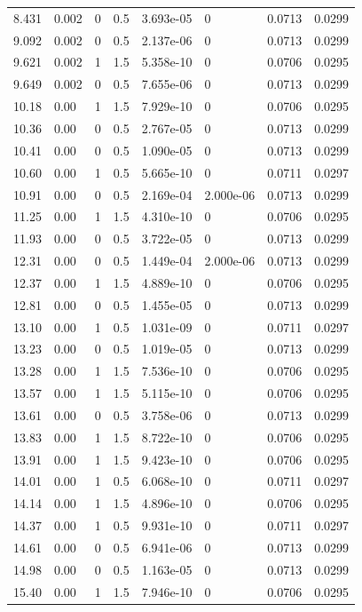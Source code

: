 \documentclass[preview]{standalone}
\begin{document}
{{\begin{tabular}{L{1.2cm}C{1.2cm} C{0.3cm}C{0.5cm} C{1.4cm}C{1.4cm} C{1.4cm}C{1.4cm}}
  8.431  &  0.002  & 0     & 0.5 &  3.693e-05  & 0  & 0.0713 &  0.0299   \\ 
  9.092  &  0.002  & 0     & 0.5 &  2.137e-06  & 0  & 0.0713 &  0.0299   \\ 
  9.621  &  0.002  & 1     & 1.5 &  5.358e-10  & 0  & 0.0706 &  0.0295   \\ 
  9.649  &  0.002  & 0     & 0.5 &  7.655e-06  & 0  & 0.0713 &  0.0299   \\ 
  10.18  &  0.00  & 1     & 1.5 &  7.929e-10  & 0  & 0.0706 &  0.0295   \\ 
  10.36  &  0.00  & 0     & 0.5 &  2.767e-05  & 0  & 0.0713 &  0.0299   \\ 
  10.41  &  0.00  & 0     & 0.5 &  1.090e-05  & 0  & 0.0713 &  0.0299   \\ 
  10.60  &  0.00  & 1     & 0.5 &  5.665e-10  & 0  & 0.0711 &  0.0297   \\ 
  10.91  &  0.00  & 0     & 0.5 &  2.169e-04  & 2.000e-06  & 0.0713 &  0.0299   \\ 
  11.25  &  0.00  & 1     & 1.5 &  4.310e-10  & 0  & 0.0706 &  0.0295   \\ 
  11.93  &  0.00  & 0     & 0.5 &  3.722e-05  & 0  & 0.0713 &  0.0299   \\ 
  12.31  &  0.00  & 0     & 0.5 &  1.449e-04  & 2.000e-06  & 0.0713 &  0.0299   \\ 
  12.37  &  0.00  & 1     & 1.5 &  4.889e-10  & 0  & 0.0706 &  0.0295   \\ 
  12.81  &  0.00  & 0     & 0.5 &  1.455e-05  & 0  & 0.0713 &  0.0299   \\ 
  13.10  &  0.00  & 1     & 0.5 &  1.031e-09  & 0  & 0.0711 &  0.0297   \\ 
  13.23  &  0.00  & 0     & 0.5 &  1.019e-05  & 0  & 0.0713 &  0.0299   \\ 
  13.28  &  0.00  & 1     & 1.5 &  7.536e-10  & 0  & 0.0706 &  0.0295   \\ 
  13.57  &  0.00  & 1     & 1.5 &  5.115e-10  & 0  & 0.0706 &  0.0295   \\ 
  13.61  &  0.00  & 0     & 0.5 &  3.758e-06  & 0  & 0.0713 &  0.0299   \\ 
  13.83  &  0.00  & 1     & 1.5 &  8.722e-10  & 0  & 0.0706 &  0.0295   \\ 
  13.91  &  0.00  & 1     & 1.5 &  9.423e-10  & 0  & 0.0706 &  0.0295   \\ 
  14.01  &  0.00  & 1     & 0.5 &  6.068e-10  & 0  & 0.0711 &  0.0297   \\ 
  14.14  &  0.00  & 1     & 1.5 &  4.896e-10  & 0  & 0.0706 &  0.0295   \\ 
  14.37  &  0.00  & 1     & 0.5 &  9.931e-10  & 0  & 0.0711 &  0.0297   \\ 
  14.61  &  0.00  & 0     & 0.5 &  6.941e-06  & 0  & 0.0713 &  0.0299   \\ 
  14.98  &  0.00  & 0     & 0.5 &  1.163e-05  & 0  & 0.0713 &  0.0299   \\ 
  15.40  &  0.00  & 1     & 1.5 &  7.946e-10  & 0  & 0.0706 &  0.0295   \\ 
\hline 
\end{tabular} 

}}
\end{document}

